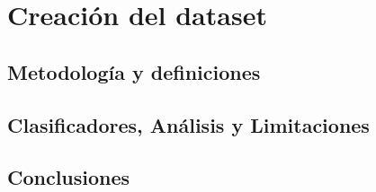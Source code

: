 \documentclass[11pt,a4paper,twoside]{tesis}
\begin{document}
\part{Creación del dataset}

\chapter{Metodología y definiciones}

\chapter{Clasificadores, Análisis y Limitaciones}


\chapter{Conclusiones}


\appendix






\backmatter

\end{document}

